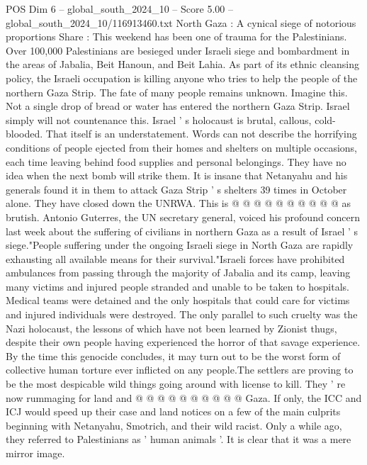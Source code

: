 \begin{textsample}{POS Dim 6 – global\_south\_2024\_10 – Score 5.00 – global\_south\_2024\_10/116913460.txt}  \label{ex:f6_pos_418}
North Gaza : A cynical siege of notorious proportions Share : This weekend has been one of trauma for the Palestinians.
Over 100,000 Palestinians are besieged under Israeli siege and bombardment in the areas of Jabalia, Beit Hanoun, and Beit Lahia.
As part of its ethnic cleansing policy, the Israeli occupation is killing anyone who tries to help the people of the northern Gaza Strip.
The fate of many people remains unknown.
Imagine this.
Not a single drop of bread or water has entered the northern Gaza Strip.
Israel simply will not countenance this.
Israel ' s holocaust is brutal, callous, cold-blooded.
That itself is an understatement.
Words can not describe the horrifying conditions of people ejected from their homes and shelters on multiple occasions, each time leaving behind food supplies and personal belongings.
They have no idea when the next bomb will strike them.
It is insane that Netanyahu and his generals found it in them to attack Gaza Strip ' s shelters 39 times in October alone.
They have closed down the UNRWA.
This is @ @ @ @ @ @ @ @ @ @ as brutish.
Antonio Guterres, the UN secretary general, voiced his profound concern last week about the suffering of civilians in northern Gaza as a result of Israel ' s siege."People suffering under the ongoing Israeli siege in North Gaza are rapidly exhausting all available means for their survival."Israeli forces have prohibited ambulances from passing through the majority of Jabalia and its camp, leaving many victims and injured people stranded and unable to be taken to hospitals.
Medical teams were detained and the only hospitals that could care for victims and injured individuals were destroyed.
The only parallel to such cruelty was the Nazi holocaust, the lessons of which have not been learned by Zionist thugs, despite their own people having experienced the horror of that savage experience.
By the time this genocide concludes, it may turn out to be the worst form of collective human torture ever inflicted on any people.The settlers are proving to be the most despicable wild things going around with license to kill.
They ' re now rummaging for land and @ @ @ @ @ @ @ @ @ @ Gaza.
If only, the ICC and ICJ would speed up their case and land notices on a few of the main culprits beginning with Netanyahu, Smotrich, and their wild racist.
Only a while ago, they referred to Palestinians as ' human animals '.
It is clear that it was a mere mirror image.

\end{textsample}
